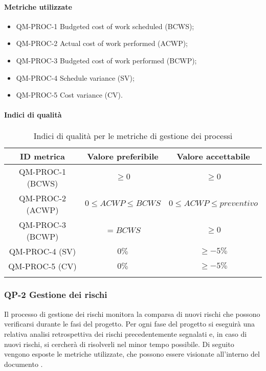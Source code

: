 		\paragraph{Metriche utilizzate}

			\begin{itemize}
				\item QM-PROC-1 Budgeted cost of work scheduled (BCWS);
				\item QM-PROC-2 Actual cost of work performed (ACWP);
				\item QM-PROC-3 Budgeted cost of work performed (BCWP);
				\item QM-PROC-4 Schedule variance (SV);
				\item QM-PROC-5 Cost variance (CV).
			\end{itemize}
		\pagebreak
		\paragraph{Indici di qualità}

			\begin{center}
				\begin{longtable}{|c|c|c|}
				\hline
				\rowcolor{lighter-grayer}
				\textbf{ID metrica} & \textbf{Valore preferibile} & \textbf{Valore accettabile}\\
				\hline
				\endfirsthead
				\hline
				QM-PROC-1 (BCWS) & \(\ge 0\) & \(\ge 0\) \\
				\hline
				QM-PROC-2 (ACWP) & \(0 \le ACWP \le BCWS\) & \(0 \le ACWP \le preventivo\) \\
				\hline
				QM-PROC-3 (BCWP) & \(= BCWS\) & \(\ge 0\) \\
				\hline
				QM-PROC-4 (SV) & \(0\%\) & \(\ge -5\%\) \\
				\hline
				QM-PROC-5 (CV) & \(0\%\) & \(\ge -5\%\) \\
				\hline
				\caption{Indici di qualità per le metriche di gestione dei processi}
				\end{longtable}
			\end{center}

	\subsubsection{QP-2 Gestione dei rischi}

		Il processo di gestione dei rischi monitora la comparsa di nuovi rischi che possono verificarsi durante le fasi del progetto.
		\newline
		Per ogni fase del progetto si eseguirà una relativa analisi retrospettiva dei rischi precedentemente segnalati e, in caso di nuovi rischi, si cercherà di risolverli nel minor tempo possibile.
		\newline
		Di seguito vengono esposte le metriche utilizzate, che possono essere visionate all'interno del documento .


